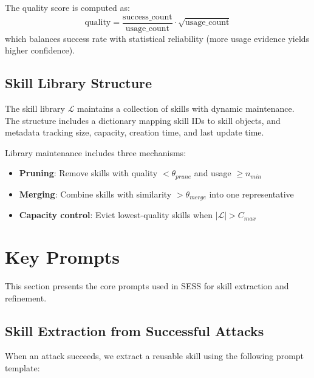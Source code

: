 \documentclass{article} %
\begin{document}
The quality score is computed as:
\begin{equation}
\text{quality} = \frac{\text{success\_count}}{\text{usage\_count}} \cdot \sqrt{\text{usage\_count}}
\end{equation}
which balances success rate with statistical reliability (more usage evidence yields higher confidence).

\subsection{Skill Library Structure}

The skill library $\mathcal{L}$ maintains a collection of skills with dynamic maintenance. The structure includes a dictionary mapping skill IDs to skill objects, and metadata tracking size, capacity, creation time, and last update time.

Library maintenance includes three mechanisms:
\begin{itemize}[leftmargin=*]
    \item \textbf{Pruning}: Remove skills with quality $< \theta_{prune}$ and usage $\geq n_{min}$
    \item \textbf{Merging}: Combine skills with similarity $> \theta_{merge}$ into one representative
    \item \textbf{Capacity control}: Evict lowest-quality skills when $|\mathcal{L}| > C_{max}$
\end{itemize}

\section{Key Prompts}
\label{sec:prompts}

This section presents the core prompts used in SESS for skill extraction and refinement.

\subsection{Skill Extraction from Successful Attacks}

When an attack succeeds, we extract a reusable skill using the following prompt template:
\end{document}
